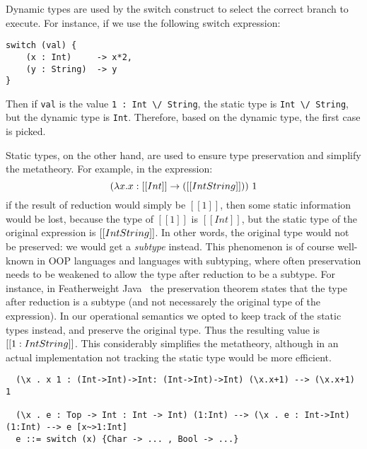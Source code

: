 Dynamic types are used by the switch construct
to select the correct branch to execute.
For instance, if we use the following switch expression:

\begin{lstlisting}
switch (val) {
    (x : Int)     -> x*2,
    (y : String)  -> y
}
\end{lstlisting}

\noindent Then if \lstinline{val} is the value \lstinline{1 : Int \/ String},
the static type is \lstinline{Int \/ String}, but the dynamic
type is \lstinline{Int}. Therefore, based on the dynamic type,
the first case is picked.

Static types, on the other hand, are used to ensure type preservation
and simplify the metatheory.
For example, in the expression:
%
\[(\lambda x . x : [[Int]] \to ([[Int \/ String]]))~1\]
%
\noindent if the result of reduction would simply be $[[1]]$, then some
static information would be lost, because the type of $[[1]]$ is $[[Int]]$,
but the static type of the original expression is $[[Int \/ String]]$.
In other words, the original type would not be preserved: we
would get a \emph{subtype} instead. This phenomenon is of course well-known
in OOP languages and languages with subtyping, where often preservation
needs to be weakened to allow the type after reduction to be a subtype.
For instance, in Featherweight Java~\cite{DBLP:journals/toplas/IgarashiPW01}
the preservation theorem states that the type after reduction is a
subtype (and not necessarely the original type of the expression). In our
operational semantics we opted to keep track of the static types instead,
and preserve the original type. Thus the resulting value is $[[1 : Int \/ String]]$.
This considerably simplifies the metatheory, although in an actual
implementation not tracking the static type would be more efficient.


\begin{verbatim}
  (\x . x 1 : (Int->Int)->Int: (Int->Int)->Int) (\x.x+1) --> (\x.x+1) 1

  (\x . e : Top -> Int : Int -> Int) (1:Int) --> (\x . e : Int->Int) (1:Int) --> e [x~>1:Int]
  e ::= switch (x) {Char -> ... , Bool -> ...}
\end{verbatim}

